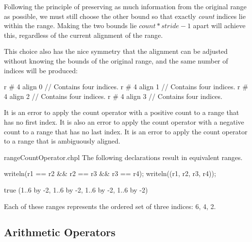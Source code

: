 \begin{rationale}
Following the principle of preserving as much information from the original
range as possible, we must still choose the other bound so that
exactly \emph{count} indices lie within the range.  Making the two bounds lie
$count * stride - 1$ apart will achieve this, regardless of the current
alignment of the range.

This choice also has the nice symmetry that the alignment can be adjusted
without knowing the bounds of the original range, and the same number of indices
will be produced:
\begin{chapel}
r # 4 align 0   // Contains four indices.
r # 4 align 1   // Contains four indices.
r # 4 align 2   // Contains four indices.
r # 4 align 3   // Contains four indices.
\end{chapel}
\end{rationale}

It is an error to apply the count operator with a positive count to a range that
has no first index.  It is also an error to apply the count operator
with a negative count to a range that has no last index.
It is an error to apply the count operator to a range that is ambiguously aligned.

\begin{chapelexample}{rangeCountOperator.chpl}
The following declarations result in equivalent ranges.
\begin{chapelpost}
writeln(r1 == r2 \&\& r2 == r3 \&\& r3 == r4);
writeln((r1, r2, r3, r4));
\end{chapelpost}
\begin{chapeloutput}
true
(1..6 by -2, 1..6 by -2, 1..6 by -2, 1..6 by -2)
\end{chapeloutput}
Each of these ranges represents the ordered set of three indices: 6, 4, 2.
\end{chapelexample}

\subsection{Arithmetic Operators}
\label{Range_Arithmetic}


